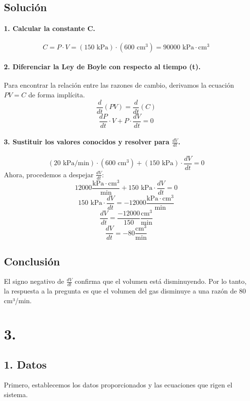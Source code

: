 \documentclass[12pt, letterpaper]{article}
\begin{document}
\subsection*{Solución}

\paragraph{1. Calcular la constante C.}
$$
C = P \cdot V = (150 \text{ kPa}) \cdot (600 \text{ cm}^3) = 90000 \text{ kPa} \cdot \text{cm}^3
$$

\paragraph{2. Diferenciar la Ley de Boyle con respecto al tiempo (t).}
Para encontrar la relación entre las razones de cambio, derivamos la ecuación $PV = C$ de forma implícita.
$$
\frac{d}{dt}(PV) = \frac{d}{dt}(C)
$$
$$
\frac{dP}{dt} \cdot V + P \cdot \frac{dV}{dt} = 0
$$

\paragraph{3. Sustituir los valores conocidos y resolver para $\frac{dV}{dt}$.}
$$
(20 \text{ kPa/min}) \cdot (600 \text{ cm}^3) + (150 \text{ kPa}) \cdot \frac{dV}{dt} = 0
$$
Ahora, procedemos a despejar $\frac{dV}{dt}$:
$$
12000 \frac{\text{kPa} \cdot \text{cm}^3}{\text{min}} + 150 \text{ kPa} \cdot \frac{dV}{dt} = 0
$$
$$
150 \text{ kPa} \cdot \frac{dV}{dt} = -12000 \frac{\text{kPa} \cdot \text{cm}^3}{\text{min}}
$$
$$
\frac{dV}{dt} = \frac{-12000}{150} \frac{\text{cm}^3}{\text{min}}
$$
$$
\frac{dV}{dt} = -80 \frac{\text{cm}^3}{\text{min}}
$$

\subsection*{Conclusión}
El signo negativo de $\frac{dV}{dt}$ confirma que el volumen está disminuyendo. Por lo tanto, la respuesta a la pregunta es que el volumen del gas disminuye a una razón de 80 cm³/min.
\vspace{1cm}

\section*{3.}

\subsection*{1. Datos}
Primero, establecemos los datos proporcionados y las ecuaciones que rigen el sistema.
\end{document}
